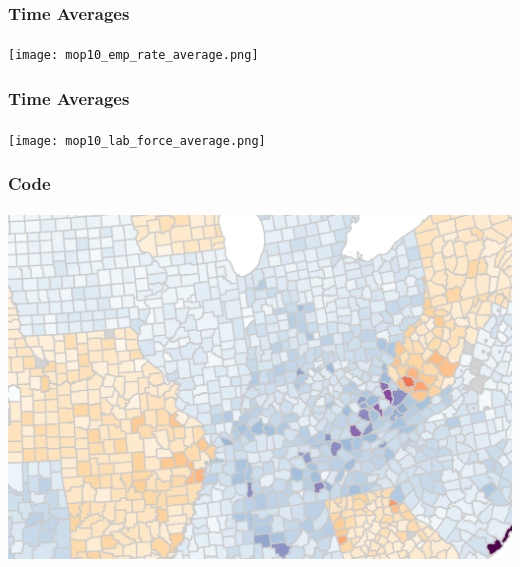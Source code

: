 \begin{frame}

    \label{ta_2}
    
    \frametitle{Time Averages} %
    \framesubtitle{}  %
    \rmfamily %

    \begin{center}
        \texttt{[image: mop10\_emp\_rate\_average.png]}
    \end{center}
    
    \hyperlink{emp_rate_result}{}
    
\end{frame}

\begin{frame}

    \label{ta_3}
    
    \frametitle{Time Averages} %
    \framesubtitle{}  %
    \rmfamily %

    \begin{center}
        \texttt{[image: mop10\_lab\_force\_average.png]}
    \end{center}
    
    \hyperlink{lab_force_rate_result}{}
    
\end{frame}

\begin{frame}

    \label{github_link}
    
    \frametitle{Code} %
    \framesubtitle{}  %
    \rmfamily %
    
    \begin{center}
        \href{https://github.com/guillelozabala/masters_thesis}{\includegraphics[scale=0.4]{thumbnail.png}}
    \end{center}
    
    
\end{frame}

